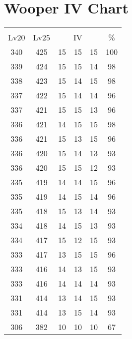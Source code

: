 \documentclass{article}%
\begin{document}
%
\normalsize%
\section{Wooper IV Chart}%
\label{sec:Wooper IV Chart}%
\renewcommand{\arraystretch}{1.5}%
\begin{tabular}{|c|c|c|c|c|c|}%
\hline%
\multicolumn{6}{|c|}{\textcolor{white}{ 
\linebreak{Wooper}
}%
\cellcolor{black}}\\%
\multicolumn{1}{|c}{Lv20}&\multicolumn{1}{c|}{Lv25}&\multicolumn{3}{c|}{IV}&\multicolumn{1}{|c|}{\%}\\%
\hline%
\rowcolor{color100}%
340&425&15&15&15&100\\%
\hline%
\rowcolor{color98}%
339&424&15&15&14&98\\%
\hline%
\rowcolor{color98}%
338&423&15&14&15&98\\%
\hline%
\rowcolor{color96}%
337&422&15&14&14&96\\%
\hline%
\rowcolor{color96}%
337&421&15&15&13&96\\%
\hline%
\rowcolor{color98}%
336&421&14&15&15&98\\%
\hline%
\rowcolor{color96}%
336&421&15&13&15&96\\%
\hline%
\rowcolor{color93}%
336&420&15&14&13&93\\%
\hline%
\rowcolor{color93}%
336&420&15&15&12&93\\%
\hline%
\rowcolor{color96}%
335&419&14&14&15&96\\%
\hline%
\rowcolor{color96}%
335&419&14&15&14&96\\%
\hline%
\rowcolor{color93}%
335&418&15&13&14&93\\%
\hline%
\rowcolor{color93}%
334&418&14&15&13&93\\%
\hline%
\rowcolor{color93}%
334&417&15&12&15&93\\%
\hline%
\rowcolor{color96}%
333&417&13&15&15&96\\%
\hline%
\rowcolor{color93}%
333&416&14&13&15&93\\%
\hline%
\rowcolor{color93}%
333&416&14&14&14&93\\%
\hline%
\rowcolor{color93}%
331&414&13&14&15&93\\%
\hline%
\rowcolor{color93}%
331&414&13&15&14&93\\%
\hline%
\rowcolor{color91}%
306&382&10&10&10&67\\%
\end{tabular}

%
\end{document}
